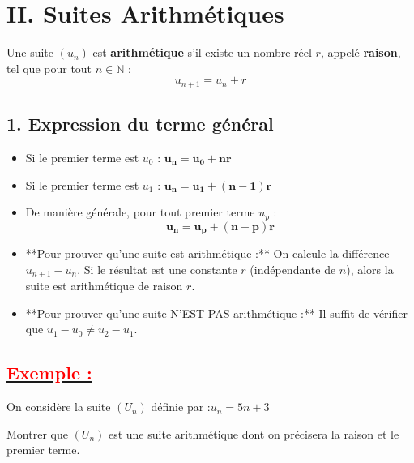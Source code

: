 \documentclass[12pt,a4paper]{article}
\begin{document}
\section*{\color{myred}II. Suites Arithmétiques}

\begin{tcolorbox}[colback=red!5!white,colframe=myred,title=\textbf{Définition}]
Une suite $(u_n)$ est \textbf{arithmétique} s'il existe un nombre réel $r$, appelé \textbf{raison}, tel que pour tout $n \in \mathbb{N}$ :
\[
u_{n+1} = u_n + r
\]
\end{tcolorbox}

\subsection*{\color{myred}1. Expression du terme général}
\begin{itemize}[label=$\bullet$]
    \item Si le premier terme est $u_0$ : $\mathbf{u_n = u_0 + nr}$
    \item Si le premier terme est $u_1$ : $\mathbf{u_n = u_1 + (n-1)r}$
    \item De manière générale, pour tout premier terme $u_p$ :
    \[
    \mathbf{u_n = u_p + (n-p)r}
    \]
\end{itemize}

\begin{tcolorbox}[colback=green!5!white,colframe=mygreen,title=\textbf{Méthode : Démontrer la nature d'une suite}]
\begin{itemize}
    \item **Pour prouver qu'une suite est arithmétique :** On calcule la différence $u_{n+1} - u_n$. Si le résultat est une constante $r$ (indépendante de $n$), alors la suite est arithmétique de raison $r$.
    \item **Pour prouver qu'une suite N'EST PAS arithmétique :** Il suffit de vérifier que $u_1 - u_0 \neq u_2 - u_1$.
\end{itemize}
\end{tcolorbox}
\subsection*{\underline{\textbf{\textcolor{red}{Exemple :}}}}
On considère la suite $(U_n)$ définie par :$ u_n = 5n + 3 $

Montrer que $(U_n)$ est une suite arithmétique dont on précisera la raison et le premier terme.
\end{document}
